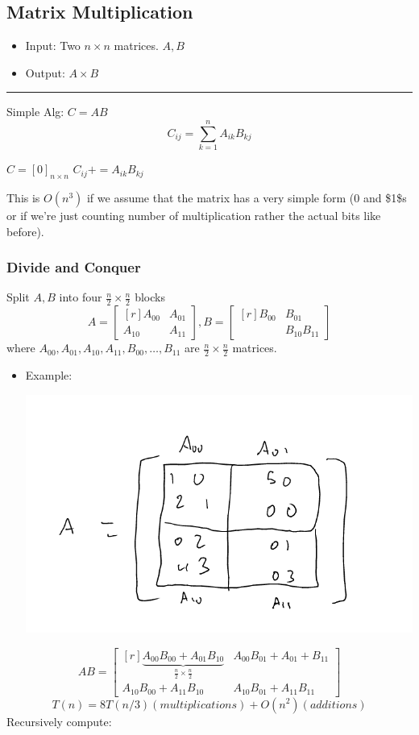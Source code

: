 \documentclass[11pt]{article}
\begin{document}
\subsection{Matrix Multiplication}
\label{sec:orgd8295c9}
\begin{itemize}
\item Input: Two \(n\times n\) matrices. \(A,B\)
\item Output: \(A \times B\)
\end{itemize}

\noindent\rule{\textwidth}{0.5pt}
Simple Alg: \(C=AB\)
$$C_{ij}=\sum_{k=1}^{n}A_{ik}B_{kj}$$
\begin{algorithmic}
\State $C=[0]_{n\times n}$
			\State $C_{ij}+=A_{ik}B_{kj}$
		\EndFor
	\EndFor
\EndFor
\end{algorithmic}
This is \(O(n^3)\) if we assume that the matrix has a very simple form (\(0\) and \$1\$s or if we're just counting number of multiplication rather the actual bits like before).
\subsubsection{Divide and Conquer}
\label{sec:org66d3bf4}
Split \(A,B\) into four \(\frac{n}{2}\times \frac{n}{2}\) blocks
$$ A = \begin{bmatrix*}[r] A_{00} & A_{01} \\ A_{10} & A_{11} \end{bmatrix*}, B = \begin{bmatrix*}[r] B_{00} & B_{01} \\ & B_{10} B_11 \end{bmatrix*}$$
where \(A_{00},A_{01}, A_{10}, A_{11}, B_{00}, \ldots, B_{11}\) are \(\frac{n}{2} \times \frac{n}{2}\) matrices.
\begin{itemize}
\item Example: \begin{center}
\includegraphics[width=.9\linewidth]{./Images/i80.png}
\end{center}
\end{itemize}
$$AB = \begin{bmatrix*}[r] \underbrace{A_{00}B_{00}+A_{01}B_{10}}_{\frac{n}{2}\times \frac{n}{2}} & A_{00}B_{01}+A_{01}+B_{11}
\\ A_{10}B_{00}+A_{11}B_{10} & A_{10}B_{01}+A_{11}B_{11}
\end{bmatrix*}$$
$$T(n)=8T(n/3) (multiplications)+O(n^2) (additions)$$
Recursively compute:
\end{document}
